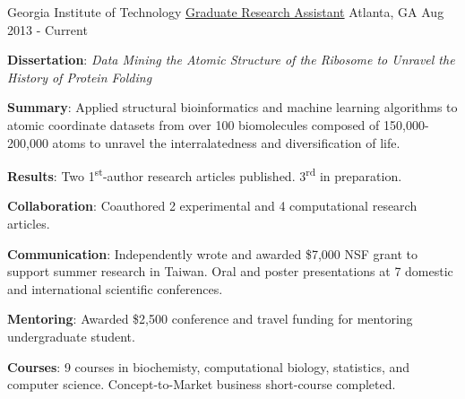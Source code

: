 

\begin{cventries}

  \cventry
    {Georgia Institute of Technology} %
    {\href{https://scholar.google.com/citations?hl=en&user=KIFFrX4AAAAJ&view_op=list_works&gmla=AJsN-F6ZS9ZeLqMG4o6JCZS87HLjoP76wA4kFValw4xx0A6ZWJJoxCWe2xu6VZvt_LgEw9YpCglVTlKY_5PfKpxiyghYFxLPNm5zrUwdBE5Fn-Sr098nt7NJGM2cH5l47IrTsSra8Vob}{Graduate Research Assistant}} %
    {Atlanta, GA} %
    {Aug 2013 - Current} %
    {{\textbf{Dissertation}: \textit{Data Mining the Atomic Structure of the Ribosome to Unravel the History of Protein Folding}}
      \begin{cvitems} %
      \vspace{4.0mm}
        \item \textbf{Summary}: Applied structural bioinformatics and machine learning algorithms to atomic coordinate datasets from over 100 biomolecules composed of 150,000-200,000 atoms to unravel the interralatedness and diversification of life.
        \item \textbf{Results}: Two 1\textsuperscript{st}-author research articles published. 3\textsuperscript{rd} in preparation.
        \item \textbf{Collaboration}: Coauthored 2 experimental and 4 computational research articles.
        \item \textbf{Communication}: Independently wrote and awarded \$7,000 NSF grant to support summer research in Taiwan. Oral and poster presentations at 7 domestic and international scientific conferences.
        \item \textbf{Mentoring}: Awarded \$2,500 conference and travel funding for mentoring undergraduate student.
        \item \textbf{Courses}: 9 courses in biochemisty, computational biology, statistics, and computer science. Concept-to-Market business short-course completed.
      \end{cvitems}
    }


\end{cventries}
